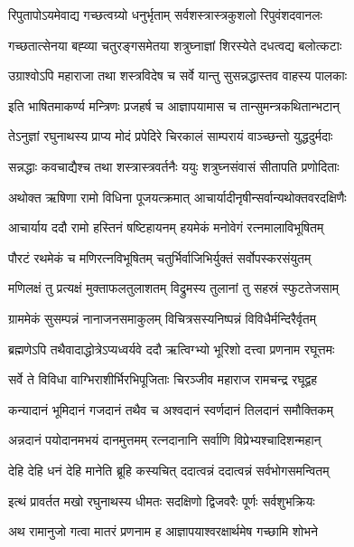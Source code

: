 \twolineshloka
{रिपुतापोऽयमेवाद्य गच्छत्वग्र्यो धनुर्भृताम्}
{सर्वशस्त्रास्त्रकुशलो रिपुवंशदवानलः}%

\twolineshloka
{गच्छतात्सेनया बह्व्या चतुरङ्गसमेतया}
{शत्रुघ्नाज्ञां शिरस्येते दधत्वद्य बलोत्कटाः}%

\twolineshloka
{उग्राश्वोऽपि महाराजा तथा शस्त्रविदेष च}
{सर्वे यान्तु सुसन्नद्धास्तव वाहस्य पालकाः}%

\twolineshloka
{इति भाषितमाकर्ण्य मन्त्रिणः प्रजहर्ष च}
{आज्ञापयामास च तान्सुमन्त्रकथितान्भटान्}%

\twolineshloka
{तेऽनुज्ञां रघुनाथस्य प्राप्य मोदं प्रपेदिरे}
{चिरकालं साम्परायं वाञ्च्छन्तो युद्धदुर्मदाः}%

\twolineshloka
{सन्नद्धाः कवचाद्यैश्च तथा शस्त्रास्त्रवर्तनैः}
{ययुः शत्रुघ्नसंवासं सीतापति प्रणोदिताः}%


\twolineshloka
{अथोक्त ऋषिणा रामो विधिना पूजयत्क्रमात्}
{आचार्यादीनृषीन्सर्वान्यथोक्तवरदक्षिणैः}%

\twolineshloka
{आचार्याय ददौ रामो हस्तिनं षष्टिहायनम्}
{हयमेकं मनोवेगं रत्नमालाविभूषितम्}%

\twolineshloka
{पौरटं रथमेकं च मणिरत्नविभूषितम्}
{चतुर्भिर्वाजिभिर्युक्तं सर्वोपस्करसंयुतम्}%

\twolineshloka
{मणिलक्षं तु प्रत्यक्षं मुक्ताफलतुलाशतम्}
{विद्रुमस्य तुलानां तु सहस्रं स्फुटतेजसाम्}%

\twolineshloka
{ग्राममेकं सुसम्पन्नं नानाजनसमाकुलम्}
{विचित्रसस्यनिष्पन्नं विविधैर्मन्दिरैर्वृतम्}%

\twolineshloka
{ब्रह्मणेऽपि तथैवादाद्धोत्रेऽप्यध्वर्यवे ददौ}
{ऋत्विग्भ्यो भूरिशो दत्त्वा प्रणनाम रघूत्तमः}%

\twolineshloka
{सर्वे ते विविधा वाग्भिराशीर्भिरभिपूजिताः}
{चिरञ्जीव महाराज रामचन्द्र रघूद्वह}%

\twolineshloka
{कन्यादानं भूमिदानं गजदानं तथैव च}
{अश्वदानं स्वर्णदानं तिलदानं समौक्तिकम्}%

\twolineshloka
{अन्नदानं पयोदानमभयं दानमुत्तमम्}
{रत्नदानानि सर्वाणि विप्रेभ्यश्चादिशन्महान्}%

\twolineshloka
{देहि देहि धनं देहि मानेति ब्रूहि कस्यचित्}
{ददात्वन्नं ददात्वन्नं सर्वभोगसमन्वितम्}%

\twolineshloka
{इत्थं प्रावर्तत मखो रघुनाथस्य धीमतः}
{सदक्षिणो द्विजवरैः पूर्णः सर्वशुभक्रियः}%

\twolineshloka
{अथ रामानुजो गत्वा मातरं प्रणनाम ह}
{आज्ञापयाश्वरक्षार्थमेष गच्छामि शोभने}%

